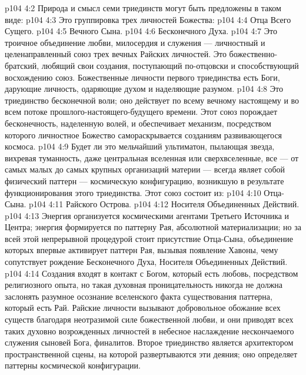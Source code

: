 \vs p104 4:2 \pc Природа и смысл семи триединств могут быть предложены в таком виде:
\vs p104 4:3 \pc {} Это группировка трех личностей Божества:
\vs p104 4:4 \bibnobreakspace Отца Всего Сущего.
\vs p104 4:5 \bibnobreakspace Вечного Сына.
\vs p104 4:6 \bibnobreakspace Бесконечного Духа.
\vs p104 4:7 \pc Это троичное объединение любви, милосердия и служения --- личностный и целенаправленный союз трех вечных Райских личностей. Это божественно\hyp{}братский, любящий свои создания, поступающий по\hyp{}отцовски и способствующий восхождению союз. Божественные личности первого триединства есть Боги, дарующие личность, одаряющие духом и наделяющие разумом.
\vs p104 4:8 Это триединство бесконечной воли; оно действует по всему вечному настоящему и во всем потоке прошлого\hyp{}настоящего\hyp{}будущего времени. Этот союз порождает бесконечность, наделенную волей, и обеспечивает механизм, посредством которого личностное Божество самораскрывается созданиям развивающегося космоса.
\vs p104 4:9 \pc {} Будет ли это мельчайший ультиматон, пылающая звезда, вихревая туманность, даже центральная вселенная или сверхвселенные, все --- от самых малых до самых крупных организаций материи --- всегда являет собой физический паттерн --- космическую конфигурацию, возникшую в результате функционирования этого триединства. Этот союз состоит из:
\vs p104 4:10 \bibnobreakspace Отца\hyp{}Сына.
\vs p104 4:11 \bibnobreakspace Райского Острова.
\vs p104 4:12 \bibnobreakspace Носителя Объединенных Действий.
\vs p104 4:13 \pc Энергия организуется космическими агентами Третьего Источника и Центра; энергия формируется по паттерну Рая, абсолютной материализации; но за всей этой непрерывной процедурой стоит присутствие Отца\hyp{}Сына, объединение которых впервые активирует паттерн Рая, вызывая появление Хавоны, чему сопутствует рождение Бесконечного Духа, Носителя Объединенных Действий.
\vs p104 4:14 Создания входят в контакт с Богом, который есть любовь, посредством религиозного опыта, но такая духовная проницательность никогда не должна заслонять разумное осознание вселенского факта существования паттерна, который есть Рай. Райские личности вызывают добровольное обожание всех существ благодаря неотразимой силе божественной любви, и они приводят всех таких духовно возрожденных личностей в небесное наслаждение нескончаемого служения сыновей Бога, финалитов. Второе триединство является архитектором пространственной сцены, на которой развертываются эти деяния; оно определяет паттерны космической конфигурации.
